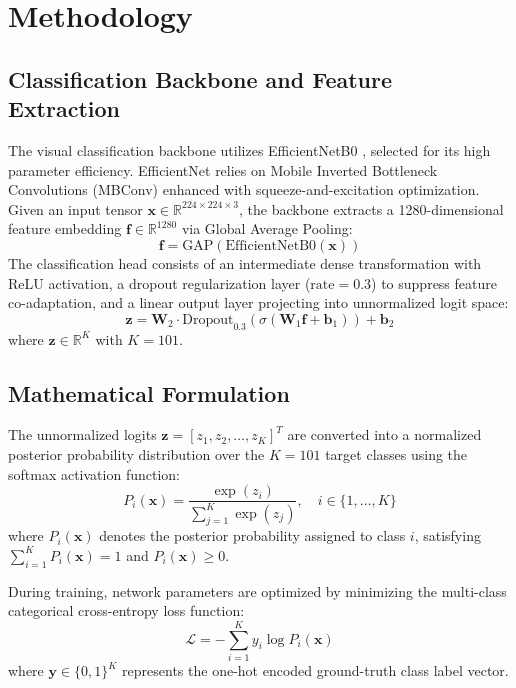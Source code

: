 \documentclass[conference]{IEEEtran}
\begin{document}
\section{Methodology}
\subsection{Classification Backbone and Feature Extraction}
The visual classification backbone utilizes EfficientNetB0 \cite{tan2019efficientnet}, selected for its high parameter efficiency. EfficientNet relies on Mobile Inverted Bottleneck Convolutions (MBConv) enhanced with squeeze-and-excitation optimization. Given an input tensor $\mathbf{x} \in \mathbb{R}^{224 \times 224 \times 3}$, the backbone extracts a 1280-dimensional feature embedding $\mathbf{f} \in \mathbb{R}^{1280}$ via Global Average Pooling:
\begin{equation}
\mathbf{f} = \text{GAP}(\text{EfficientNetB0}(\mathbf{x}))
\end{equation}
The classification head consists of an intermediate dense transformation with ReLU activation, a dropout regularization layer ($\text{rate} = 0.3$) to suppress feature co-adaptation, and a linear output layer projecting into unnormalized logit space:
\begin{equation}
\mathbf{z} = \mathbf{W}_2 \cdot \text{Dropout}_{0.3}(\sigma(\mathbf{W}_1 \mathbf{f} + \mathbf{b}_1)) + \mathbf{b}_2
\end{equation}
where $\mathbf{z} \in \mathbb{R}^{K}$ with $K = 101$.

\subsection{Mathematical Formulation}
The unnormalized logits $\mathbf{z} = [z_1, z_2, \dots, z_K]^T$ are converted into a normalized posterior probability distribution over the $K = 101$ target classes using the softmax activation function:
\begin{equation}
P_i(\mathbf{x}) = \frac{\exp(z_i)}{\sum_{j=1}^{K} \exp(z_j)}, \quad i \in \{1, \dots, K\}
\label{eq:softmax}
\end{equation}
where $P_i(\mathbf{x})$ denotes the posterior probability assigned to class $i$, satisfying $\sum_{i=1}^{K} P_i(\mathbf{x}) = 1$ and $P_i(\mathbf{x}) \ge 0$.

During training, network parameters are optimized by minimizing the multi-class categorical cross-entropy loss function:
\begin{equation}
\mathcal{L} = -\sum_{i=1}^{K} y_i \log P_i(\mathbf{x})
\end{equation}
where $\mathbf{y} \in \{0, 1\}^K$ represents the one-hot encoded ground-truth class label vector.
\end{document}
